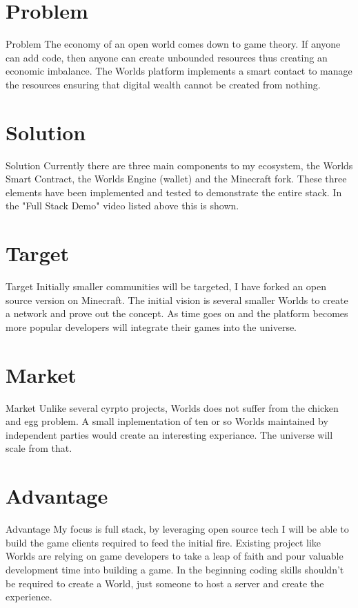 \documentclass[final, ngerman, xcolor=pdftex, dvipsnames, table, aspectratio=169, 14pt]{beamer}
\begin{document}
\section{Problem}
\begin{frame}{Problem}
The economy of an open world comes down to game theory. If anyone can add code, then anyone can create unbounded resources thus creating an economic imbalance. The Worlds platform implements a smart contact to manage the resources ensuring that digital wealth cannot be created from nothing.  
\end{frame}

\section{Solution}
\begin{frame}{Solution}
Currently there are three main components to my ecosystem, the Worlds Smart Contract, the Worlds Engine (wallet) and the Minecraft fork. These three elements have been implemented and tested to demonstrate the entire stack. In the "Full Stack Demo" video listed above this is shown.
\end{frame}

\section{Target}
\begin{frame}{Target}
Initially smaller communities will be targeted, I have forked an open source version on Minecraft. The initial vision is several smaller Worlds to create a network and prove out the concept. As time goes on and the platform becomes more popular developers will integrate their games into the universe.
\end{frame}

\section{Market}
\begin{frame}{Market}
Unlike several cyrpto projects, Worlds does not suffer from the chicken and egg problem. A small inplementation of ten or so Worlds maintained by independent parties would create an interesting experiance. The universe will scale from that.
\end{frame}

\section{Advantage}
\begin{frame}{Advantage}
My focus is full stack, by leveraging open source tech I will be able to build the game clients required to feed the initial fire. Existing project like Worlds are relying on game developers to take a leap of faith and pour valuable development time into building a game. In the beginning coding skills shouldn't be required to create a World, just someone to host a server and create the experience. 
\end{frame}
\end{document}
